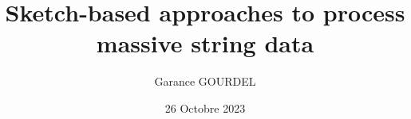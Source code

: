 





\author{Garance GOURDEL}

\title{Sketch-based approaches to process massive string data}
\date{26 Octobre 2023}




